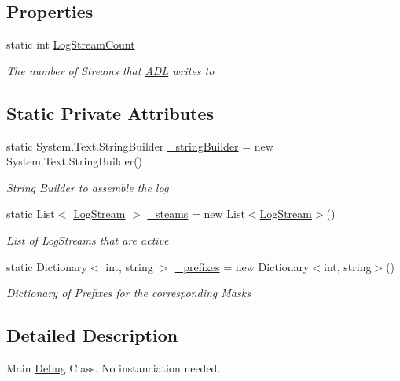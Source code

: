 \subsection*{Properties}
\begin{DoxyCompactItemize}
\item 
static int \mbox{\hyperlink{class_a_d_l_1_1_debug_a5a63093ff8ac05237224edcce57396c4}{Log\+Stream\+Count}}
\begin{DoxyCompactList}\small\item\em The number of Streams that \mbox{\hyperlink{namespace_a_d_l}{A\+DL}} writes to \end{DoxyCompactList}\end{DoxyCompactItemize}
\subsection*{Static Private Attributes}
\begin{DoxyCompactItemize}
\item 
static System.\+Text.\+String\+Builder \mbox{\hyperlink{class_a_d_l_1_1_debug_a8f063e98d96cd91379b5f63969124877}{\+\_\+string\+Builder}} = new System.\+Text.\+String\+Builder()
\begin{DoxyCompactList}\small\item\em String Builder to assemble the log \end{DoxyCompactList}\item 
static List$<$ \mbox{\hyperlink{class_a_d_l_1_1_log_stream}{Log\+Stream}} $>$ \mbox{\hyperlink{class_a_d_l_1_1_debug_a5d5f16baa54da2aef4115a02a7253d40}{\+\_\+steams}} = new List$<$\mbox{\hyperlink{class_a_d_l_1_1_log_stream}{Log\+Stream}}$>$()
\begin{DoxyCompactList}\small\item\em List of Log\+Streams that are active \end{DoxyCompactList}\item 
static Dictionary$<$ int, string $>$ \mbox{\hyperlink{class_a_d_l_1_1_debug_ae158a8228eacba82054cb7b340153fe9}{\+\_\+prefixes}} = new Dictionary$<$int, string$>$()
\begin{DoxyCompactList}\small\item\em Dictionary of Prefixes for the corresponding Masks \end{DoxyCompactList}\end{DoxyCompactItemize}


\subsection{Detailed Description}
Main \mbox{\hyperlink{class_a_d_l_1_1_debug}{Debug}} Class. No instanciation needed. 



